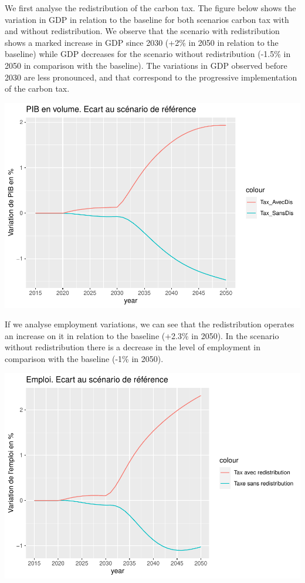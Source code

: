 \documentclass[
]{article}
\begin{document}
We first analyse the redistribution of the carbon tax. The figure below
shows the variation in GDP in relation to the baseline for both
scenarios carbon tax with and without redistribution. We observe that
the scenario with redistribution shows a marked increase in GDP since
2030 (+2\% in 2050 in relation to the baseline) while GDP decreases for
the scenario without redistribution (-1.5\% in 2050 in comparison with
the baseline). The variations in GDP observed before 2030 are less
pronounced, and that correspond to the progressive implementation of the
carbon tax.

\begin{center}\includegraphics[width=0.7\linewidth,height=0.7\textheight]{Modele-ThreeMe-Tunisie_Sequeira_Valilou_Wang_files/figure-latex/unnamed-chunk-8-1} \end{center}

If we analyse employment variations, we can see that the redistribution
operates an increase on it in relation to the baseline (+2.3\% in 2050).
In the scenario without redistribution there is a decrease in the level
of employment in comparison with the baseline (-1\% in 2050).

\begin{center}\includegraphics[width=0.7\linewidth,height=0.7\textheight]{Modele-ThreeMe-Tunisie_Sequeira_Valilou_Wang_files/figure-latex/unnamed-chunk-9-1} \end{center}
\end{document}
